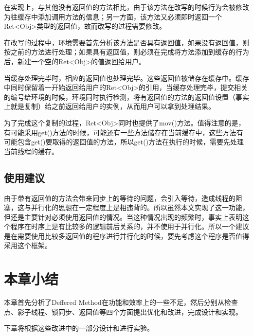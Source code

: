 在实现上，与其他没有返回值的方法相比，由于该方法在改写的时候行为会被修改为往缓存中添加调用方法的信息；另一方面，该方法又必须即时返回一个Ret<Obj>类型的返回值，故而改写的过程需要修改。

在改写的过程中，环境需要首先分析该方法是否具有返回值，如果没有返回值，则按之前的方法进行处理；如果具有返回值，则必须在完成将方法添加到缓存的行为后，新建一个空的Ret<Obj>的值返回给用户。

当缓存处理完毕时，相应的返回值也处理完毕。这些返回值被储存在缓存中。缓存中同时保留着一开始返回给用户的Ret<Obj>的引用，当缓存处理完毕，提交相关的编号给环境的时候，环境同时执行检测，将有返回值的方法的返回值设置（事实上就是复制）给之前返回给用户的实例，从而用户可以拿到处理结果。

为了完成这个复制的过程，Ret<Obj>同时也提供了mov()方法。值得注意的是，有可能采用get()方法的时候，可能还有一些方法储存在当前缓存中，这些方法有可能包含get()要取得的返回值的方法，所以get()方法在执行的时候，需要先处理当前线程的缓存。

\subsection{使用建议}

由于带有返回值的方法会带来同步上的等待的问题，会引入等待，造成线程的阻塞，这与并行化的思想在一定程度上是相违背的。所以虽然本文实现了这一功能，但还是主要针对必须使用返回值的情况。当这种情况出现的频繁时，事实上表明这个程序在时序上是有比较多的逻辑前后关系的，并不使用于并行化。所以一个建议是在需要使用比较多返回值的程序进行并行化的时候，要先考虑这个程序是否值得采用这个框架。

\section{本章小结}

本章首先分析了Deffered Method在功能和效率上的一些不足，然后分别从检查点、影子线程、锁同步、返回值等四个方面提出优化和改进，完成设计和实现。

下章将根据这些改进中的一部分设计和进行实验。
